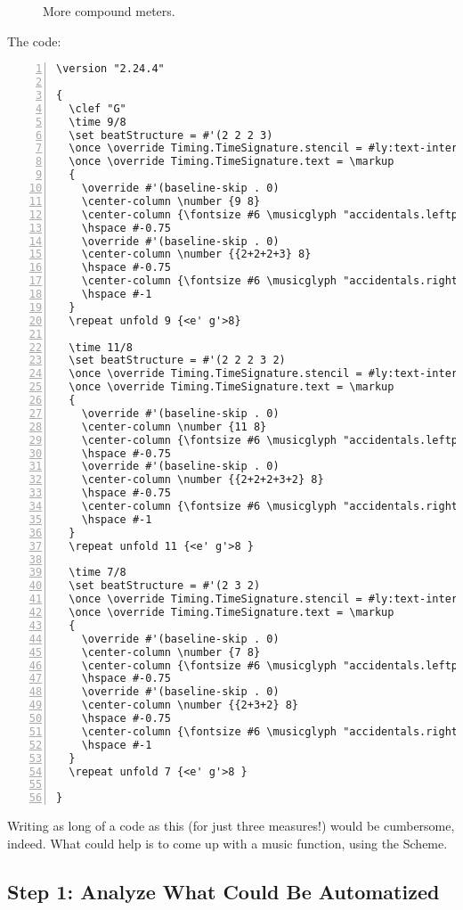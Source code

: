 	\begin{figure}[!htb]
	\centering
{}
\label{sec:schemeExample1}
	\caption{\label{fig:figure6} More compound meters.}
	\end{figure}
	
The code:
\begin{Verbatim}[numbers=left,xleftmargin=5mm]
\version "2.24.4"

{
  \clef "G"
  \time 9/8
  \set beatStructure = #'(2 2 2 3)
  \once \override Timing.TimeSignature.stencil = #ly:text-interface::print
  \once \override Timing.TimeSignature.text = \markup
  {
    \override #'(baseline-skip . 0)
    \center-column \number {9 8}
    \center-column {\fontsize #6 \musicglyph "accidentals.leftparen"}
    \hspace #-0.75
    \override #'(baseline-skip . 0)
    \center-column \number {{2+2+2+3} 8}
    \hspace #-0.75
    \center-column {\fontsize #6 \musicglyph "accidentals.rightparen"}
    \hspace #-1
  }
  \repeat unfold 9 {<e' g'>8}

  \time 11/8
  \set beatStructure = #'(2 2 2 3 2)
  \once \override Timing.TimeSignature.stencil = #ly:text-interface::print
  \once \override Timing.TimeSignature.text = \markup
  {
    \override #'(baseline-skip . 0)
    \center-column \number {11 8}
    \center-column {\fontsize #6 \musicglyph "accidentals.leftparen"}
    \hspace #-0.75
    \override #'(baseline-skip . 0)
    \center-column \number {{2+2+2+3+2} 8}
    \hspace #-0.75
    \center-column {\fontsize #6 \musicglyph "accidentals.rightparen"}
    \hspace #-1
  }
  \repeat unfold 11 {<e' g'>8 }

  \time 7/8
  \set beatStructure = #'(2 3 2)
  \once \override Timing.TimeSignature.stencil = #ly:text-interface::print
  \once \override Timing.TimeSignature.text = \markup
  {
    \override #'(baseline-skip . 0)
    \center-column \number {7 8}
    \center-column {\fontsize #6 \musicglyph "accidentals.leftparen"}
    \hspace #-0.75
    \override #'(baseline-skip . 0)
    \center-column \number {{2+3+2} 8}
    \hspace #-0.75
    \center-column {\fontsize #6 \musicglyph "accidentals.rightparen"}
    \hspace #-1
  }
  \repeat unfold 7 {<e' g'>8 }

}
\end{Verbatim}

Writing as long of a code as this (for just three measures!) would be cumbersome, indeed. What could help is to come up with a music function, using the Scheme. 

\subsection{Step 1: Analyze What Could Be Automatized}

